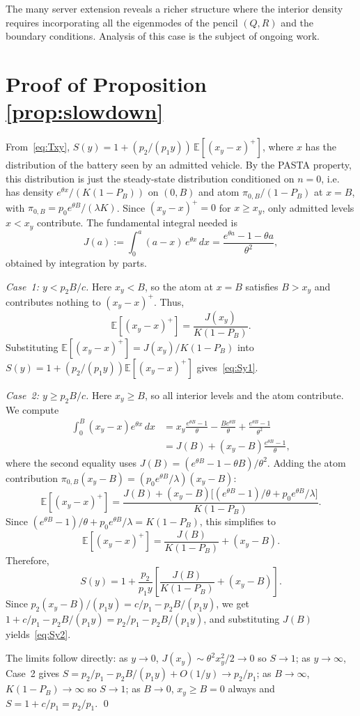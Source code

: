 \documentclass{sig-alternate-per-modified}
\renewcommand{\geq}{\geqslant}
\begin{document}
The many server extension reveals a richer structure where the interior density requires incorporating 
all the eigenmodes of the pencil $(Q,R)$ and the boundary conditions. Analysis of this case is the subject of ongoing work.





\appendix

\section{Proof of Proposition \lowercase{\ref{prop:slowdown}}}
\label{app:slowdown}

From~\eqref{eq:Txy}, $S(y) = 1 + (p_2/(p_1 y))\,\mathbb{E}[(x_y-x)^+]$,
where $x$ has the distribution of the battery seen by an admitted vehicle. By the PASTA property, this distribution is just the steady-state distribution conditioned on $n=0$, i.e. has density $e^{\theta x}/(K(1-P_B))$ on
$(0,B)$ and atom $\pi_{0,B}/(1-P_B)$ at $x=B$, with $\pi_{0,B}=p_0 e^{\theta B}/(\lambda K)$.
Since $(x_y-x)^+=0$ for $x\geq x_y$, only admitted levels $x<x_y$ contribute.
The fundamental integral needed is
\begin{equation}
  J(a) := \int_0^a (a-x)\,e^{\theta x}\,dx = \frac{e^{\theta a}-1-\theta a}{\theta^2},
  \label{eq:Ja}
\end{equation}
obtained by integration by parts.

\textit{Case~1: $y < p_2B/c$.} Here $x_y < B$, so the atom at $x=B$ satisfies
$B > x_y$ and contributes nothing to $(x_y-x)^+$. Thus,
\[
  \mathbb{E}[(x_y-x)^+] = \frac{J(x_y)}{K(1-P_B)}.
\]
Substituting $\mathbb{E}[(x_y-x)^+] = J(x_y)/K(1-P_B)$ into
$S(y) = 1+(p_2/(p_1 y))\mathbb{E}[(x_y-x)^+]$ gives~\eqref{eq:Sy1}.

\textit{Case~2: $y \geq p_2B/c$.} Here $x_y \geq B$, so all interior levels and
the atom contribute. We compute
\begin{align*}
  \int_0^B(x_y-x)e^{\theta x}\,dx
  &= x_y\frac{e^{\theta B}-1}{\theta} - \frac{Be^{\theta B}}{\theta}
     + \frac{e^{\theta B}-1}{\theta^2} \\
  &= J(B) + (x_y-B)\frac{e^{\theta B}-1}{\theta},
\end{align*}
where the second equality uses $J(B) = (e^{\theta B}-1-\theta B)/\theta^2$.
Adding the atom contribution $\pi_{0,B}(x_y-B) = (p_0 e^{\theta B}/\lambda)(x_y-B)$:
\begin{equation*}
  \mathbb{E}[(x_y-x)^+]
  = \frac{J(B) + (x_y-B)\bigl[(e^{\theta B}-1)/\theta + p_0 e^{\theta B}/\lambda\bigr]}{K(1-P_B)}.
\end{equation*}
Since $(e^{\theta B}-1)/\theta + p_0 e^{\theta B}/\lambda = K(1-P_B)$, this simplifies to
\[
  \mathbb{E}[(x_y-x)^+] = \frac{J(B)}{K(1-P_B)} + (x_y - B).
\]
Therefore,
\[
  S(y) = 1 + \frac{p_2}{p_1 y}\!\left[\frac{J(B)}{K(1-P_B)} + (x_y-B)\right].
\]
Since $p_2(x_y-B)/(p_1 y) = c/p_1 - p_2 B/(p_1 y)$, we get
$1 + c/p_1 - p_2 B/(p_1 y) = p_2/p_1 - p_2 B/(p_1 y)$, and substituting $J(B)$
yields~\eqref{eq:Sy2}.

The limits follow directly: as $y\to 0$, $J(x_y)\sim \theta^2 x_y^2/2 \to 0$
so $S\to 1$; as $y\to\infty$, Case~2 gives $S = p_2/p_1 - p_2 B/(p_1 y)+O(1/y)\to p_2/p_1$;
as $B\to\infty$, $K(1-P_B)\to\infty$ so $S\to 1$; as $B\to 0$, $x_y\geq B=0$ always
and $S = 1 + c/p_1 = p_2/p_1$. \qed
\end{document}
